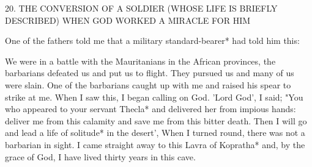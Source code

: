 20. THE CONVERSION OF A SOLDIER
(WHOSE LIFE IS BRIEFLY DESCRIBED)
WHEN GOD WORKED A MIRACLE FOR HIM

One of the fathers told me that a military standard-bearer* had told
him this:

We were in a battle with the Mauritanians in the African provinces,
the barbarians defeated us and put us to flight. They pursued us and
many of us were slain. One of the barbarians caught up with me
and raised his spear to strike at me. When I saw this, I began
calling on God. 'Lord God', I said; "You who appeared to your
servant Thecla* and delivered her from impious hands: deliver me
from this calamity and save me from this bitter death. Then I will
go and lead a life of solitude* in the desert', When I turned round,
there was not a barbarian in sight. I came straight away to this
Lavra of Kopratha* and, by the grace of God, I have lived thirty
years in this cave.

